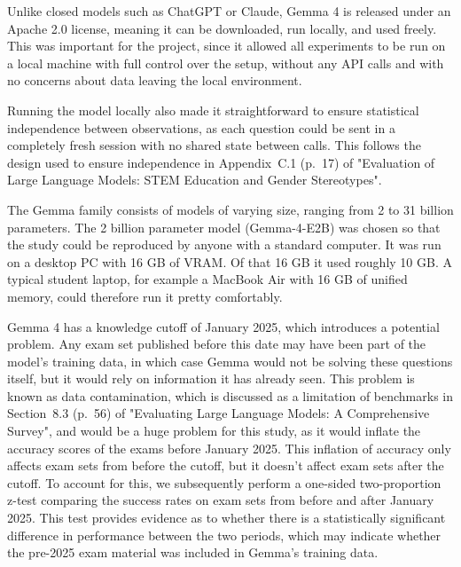 \documentclass{article}
\begin{document}
Unlike closed models such as ChatGPT or Claude, Gemma 4 is released under an Apache 2.0 license, meaning it can be downloaded, run locally, and used freely. This was important for the project, since it allowed all experiments to be run on a local machine with full control over the setup, without any API calls and with no concerns about data leaving the local environment.

Running the model locally also made it straightforward to ensure statistical independence between observations, as each question could be sent in a completely fresh session with no shared state between calls. This follows the design used to ensure independence in Appendix~C.1 (p.~17) of "Evaluation of Large Language Models: STEM Education and Gender Stereotypes"\supercite{due2024evaluation}.\newline

The Gemma family consists of models of varying size, ranging from 2 to 31 billion parameters. The 2 billion parameter model (Gemma-4-E2B) was chosen so that the study could be reproduced by anyone with a standard computer. It was run on a desktop PC with 16 GB of VRAM. Of that 16 GB it used roughly 10 GB. A typical student laptop, for example a MacBook Air with 16 GB of unified memory, could therefore run it pretty comfortably.
\newline

Gemma 4 has a knowledge cutoff of January 2025\supercite{gemma4modelcard}, which introduces a potential problem. Any exam set published before this date may have been part of the model's training data, in which case Gemma would not be solving these questions itself, but it would rely on information it has already seen. This problem is known as data contamination, which is discussed as a limitation of benchmarks in Section~8.3 (p.~56) of "Evaluating Large Language Models: A Comprehensive Survey"\supercite{guo2023evaluating}, and would be a huge problem for this study, as it would inflate the accuracy scores of the exams before January 2025. This inflation of accuracy only affects exam sets from before the cutoff, but it doesn't affect exam sets after the cutoff.
To account for this, we subsequently perform a one-sided two-proportion z-test comparing the success rates on exam sets from before and after January 2025. This test provides evidence as to whether there is a statistically significant difference in performance between the two periods, which may indicate whether the pre-2025 exam material was included in Gemma’s training data.
\end{document}
